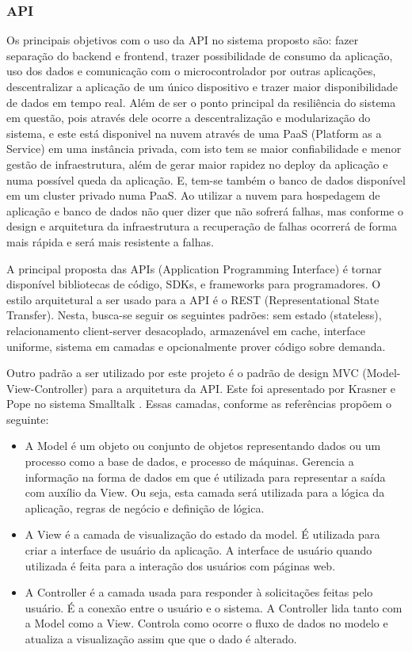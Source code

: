 \documentclass[conference]{IEEEtran}
\begin{document}
\subsubsection{API}
Os principais objetivos com o uso da API no sistema proposto são: fazer separação do backend e frontend, trazer possibilidade de consumo da aplicação, uso dos dados e comunicação com o microcontrolador por outras aplicações, descentralizar a aplicação de um único dispositivo e trazer maior disponibilidade de dados em tempo real. Além de ser o ponto principal da resiliência do sistema em questão, pois através dele ocorre a descentralização e modularização do sistema, e este está disponivel na nuvem através de uma PaaS (Platform as a Service) em uma instância privada, com isto tem se maior confiabilidade e menor gestão de infraestrutura, além de gerar maior rapidez no deploy da aplicação e numa possível queda da aplicação. E, tem-se também o banco de dados disponível em um cluster privado numa PaaS. Ao utilizar a nuvem para hospedagem de aplicação e banco de dados não quer dizer que não sofrerá falhas, mas conforme o design e arquitetura da infraestrutura a recuperação de falhas ocorrerá de forma mais rápida e será mais resistente a falhas.\cite{b28,b29}

A principal proposta das APIs (Application Programming Interface) é tornar disponível bibliotecas de código, SDKs, e frameworks para programadores.
O estilo arquitetural a ser usado para a API é o REST (Representational State Transfer). Nesta, busca-se seguir os seguintes padrões: sem estado (stateless), relacionamento client-server desacoplado, armazenável em cache, interface uniforme, sistema em camadas e opcionalmente prover código sobre demanda. \cite{b12, b13}

Outro padrão a ser utilizado por este projeto é o padrão de design MVC (Model-View-Controller) para a arquitetura da API. Este foi apresentado por Krasner e Pope no sistema Smalltalk \cite{b16}. Essas camadas, conforme as referências\cite{b14, b15}  propõem o seguinte: 
\begin{itemize}
    \item A Model é um objeto ou conjunto de objetos representando dados ou um processo como a base de dados, e processo de máquinas. Gerencia a informação na forma de dados em que é utilizada para representar a saída com auxílio da View. Ou seja, esta camada será utilizada para a lógica da aplicação, regras de negócio e definição de lógica.
    \item A View é a camada de visualização do estado da model. É utilizada para criar a interface de usuário da aplicação. A interface de usuário quando utilizada é feita para a interação dos usuários com páginas web.
    \item A Controller é a camada usada para responder à solicitações feitas pelo usuário. É a conexão entre o usuário e o sistema. A Controller lida tanto com a Model como a View. Controla como ocorre o fluxo de dados no modelo e atualiza a visualização assim que que o dado é alterado.
\end{itemize} 
\end{document}
